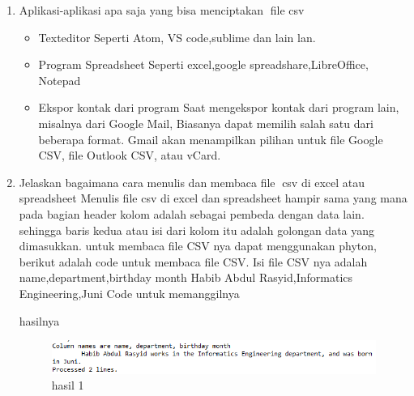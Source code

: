 \begin {enumerate}
\item Aplikasi-aplikasi apa saja yang bisa menciptakan file csv
\begin{itemize}
	\item Texteditor
	Seperti Atom, VS code,sublime dan lain lan.
	\item Program Spreadsheet
	Seperti excel,google spreadshare,LibreOffice, Notepad
	\item Ekspor kontak dari program
	Saat mengekspor kontak dari program lain, misalnya dari Google Mail, Biasanya dapat memilih salah satu dari beberapa format.
	Gmail akan menampilkan pilihan untuk file Google CSV, file Outlook CSV, atau vCard.
\end{itemize}
\item Jelaskan bagaimana cara menulis dan membaca file csv di excel atau spreadsheet\newline
Menulis file csv di excel dan spreadsheet hampir sama yang mana pada bagian header kolom adalah sebagai pembeda dengan data lain.
sehingga baris kedua atau isi dari kolom itu adalah golongan data yang dimasukkan.
untuk membaca file CSV nya dapat menggunakan phyton, berikut adalah code untuk membaca file CSV.
Isi file CSV nya adalah 
name,department,birthday month
Habib Abdul Rasyid,Informatics Engineering,Juni
Code untuk memanggilnya 

hasilnya

\begin{figure}[h]
\centering
\includegraphics[scale=0.5]{figures/4/1174002/hasil1.png}
\caption{hasil 1}
\label{fig:csv}
\end{figure}


\end{enumerate}
